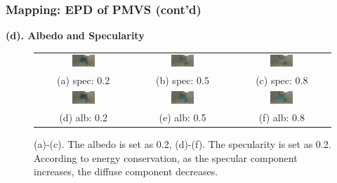 \documentclass{beamer}
\begin{document}
\begin{frame}
\frametitle{Mapping: EPD of PMVS (cont'd)}

\textbf{(d). Albedo and Specularity}
\begin{figure}[!htbp]
\centering
\begin{tabular}{ccc}
\includegraphics[width=0.25\textwidth]{mapping/mvs_alb_spec/alb_spec_0202}&
\includegraphics[width=0.25\textwidth]{mapping/mvs_alb_spec/alb_spec_0205}&
\includegraphics[width=0.25\textwidth]{mapping/mvs_alb_spec/alb_spec_0208}\\
(a) spec: 0.2 & (b) spec: 0.5 & (c) spec: 0.8\\
\includegraphics[width=0.25\textwidth]{mapping/mvs_alb_spec/alb_spec_0202}&
\includegraphics[width=0.25\textwidth]{mapping/mvs_alb_spec/alb_spec_0502}&
\includegraphics[width=0.25\textwidth]{mapping/mvs_alb_spec/alb_spec_0802}\\
(d) alb: 0.2 & (e) alb: 0.5 & (f) alb: 0.8\\
\end{tabular}
\caption{(a)-(c). The albedo is set as 0.2, (d)-(f). The specularity is set as 0.2. According to energy conservation, as the specular component increases, the diffuse component decreases.}
\end{figure}

\end{frame}
\end{document}
